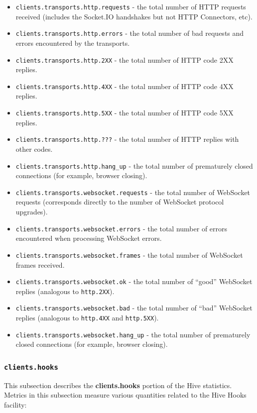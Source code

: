 \documentclass[a4paper]{article}
\begin{document}
\begin{itemize}
\item \texttt{clients.transports.http.requests} - the total number of HTTP requests received (includes the Socket.IO handshakes but not HTTP Connectors, etc).
\item \texttt{clients.transports.http.errors} - the total number of bad requests and errors encountered by the transports.
\item \texttt{clients.transports.http.2XX} - the total number of HTTP code 2XX replies.
\item \texttt{clients.transports.http.4XX} - the total number of HTTP code 4XX replies.
\item \texttt{clients.transports.http.5XX} - the total number of HTTP code 5XX replies.
\item \texttt{clients.transports.http.???} - the total number of HTTP replies with other codes.
\item \texttt{clients.transports.http.hang\_up} - the total number of prematurely closed connections (for example, browser closing).
\item \texttt{clients.transports.websocket.requests} - the total number of WebSocket requests (corresponds directly to the number of WebSocket protocol upgrades).
\item \texttt{clients.transports.websocket.errors} - the total number of errors encountered when processing WebSocket errors.
\item \texttt{clients.transports.websocket.frames} - the total number of WebSocket frames received.
\item \texttt{clients.transports.websocket.ok} - the total number of ``good'' WebSocket replies (analogous to \texttt{http.2XX}).
\item \texttt{clients.transports.websocket.bad} - the total number of ``bad'' WebSocket replies (analogous to \texttt{http.4XX} and \texttt{http.5XX}).
\item \texttt{clients.transports.websocket.hang\_up} - the total number of prematurely closed connections (for example, browser closing).
\end{itemize}
\subsubsection{\texttt{clients.hooks}}
\label{sec-4-2-9}

This subsection describes the \textbf{clients.hooks} portion of the Hive statistics. Metrics in this subsection measure various quantities related to the Hive Hooks facility:
\end{document}
